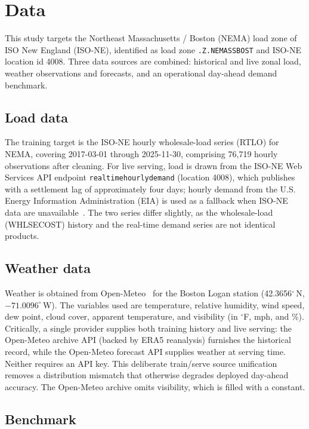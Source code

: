 \section{Data}\label{sec:data}

This study targets the Northeast Massachusetts / Boston (NEMA) load zone of
ISO New England (ISO-NE), identified as load zone \texttt{.Z.NEMASSBOST} and
ISO-NE location id 4008. Three data sources are combined: historical and live
zonal load, weather observations and forecasts, and an operational day-ahead
demand benchmark.

\subsection{Load data}

The training target is the ISO-NE hourly wholesale-load series (RTLO) for NEMA,
covering 2017-03-01 through 2025-11-30, comprising 76{,}719 hourly observations
after cleaning. For live serving, load is drawn from the ISO-NE Web Services API
endpoint \texttt{realtimehourlydemand} (location 4008), which publishes with a
settlement lag of approximately four days; hourly demand from the U.S. Energy
Information Administration (EIA) is used as a fallback when ISO-NE data are
unavailable~\cite{eia930}. The two series differ slightly, as the
wholesale-load (WHLSECOST) history and the real-time demand series are not
identical products.

\subsection{Weather data}

Weather is obtained from Open-Meteo~\cite{openmeteo} for the Boston Logan station
(42.3656$^{\circ}$\,N, $-71.0096^{\circ}$\,W). The variables used are
temperature, relative humidity, wind speed, dew point, cloud cover, apparent
temperature, and visibility (in $^{\circ}$F, mph, and \%). Critically, a single
provider supplies both training history and live serving: the Open-Meteo archive
API (backed by ERA5 reanalysis) furnishes the historical record, while the
Open-Meteo forecast API supplies weather at serving time. Neither requires an API
key. This deliberate train/serve source unification removes a distribution
mismatch that otherwise degrades deployed day-ahead accuracy. The Open-Meteo
archive omits visibility, which is filled with a constant.

\subsection{Benchmark}

